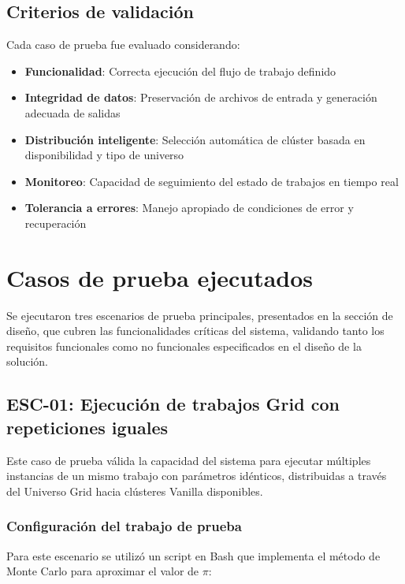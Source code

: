 \subsection{Criterios de validación}
\noindent

Cada caso de prueba fue evaluado considerando:

\begin{itemize}
	\item \textbf{Funcionalidad}: Correcta ejecución del flujo de trabajo definido
	\item \textbf{Integridad de datos}: Preservación de archivos de entrada y generación adecuada de salidas
	\item \textbf{Distribución inteligente}: Selección automática de clúster basada en disponibilidad y tipo de universo
	\item \textbf{Monitoreo}: Capacidad de seguimiento del estado de trabajos en tiempo real
	\item \textbf{Tolerancia a errores}: Manejo apropiado de condiciones de error y recuperación
\end{itemize}

\section{Casos de prueba ejecutados}
\noindent

Se ejecutaron tres escenarios de prueba principales, presentados en la sección de diseño, que cubren las funcionalidades críticas del sistema, validando tanto los requisitos funcionales como no funcionales especificados en el diseño de la solución.

\subsection{ESC-01: Ejecución de trabajos Grid con repeticiones iguales}
\noindent

Este caso de prueba válida la capacidad del sistema para ejecutar múltiples instancias de un mismo trabajo con parámetros idénticos, distribuidas a través del Universo Grid hacia clústeres Vanilla disponibles.

\subsubsection{Configuración del trabajo de prueba}
\noindent

Para este escenario se utilizó un script en Bash que implementa el método de Monte Carlo para aproximar el valor de $\pi$:

